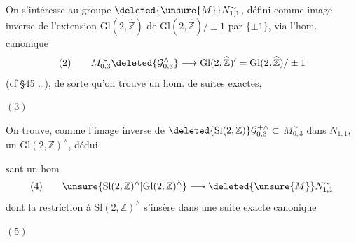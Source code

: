 On s'intéresse au groupe $\deleted{\unsure{M}}N_{1,1}^{\sim}$, défini  comme image inverse de l'extension $\mathrm{Gl}(2,\widehat{\mathbb Z})$ de $\mathrm{Gl}(2,\widehat{\mathbb Z})/\pm1$ par $\{\pm1\}$, via l'hom. canonique
\[
(2)\qquad
M_{0,3}^{\sim}\deleted{\mathcal G_{0,3}^{\wedge}}
\longrightarrow\mathrm{Gl}(2,\widehat{\mathbb Z})'
=\mathrm{Gl}(2,\widehat{\mathbb Z})/\pm1
\]
(cf \S45 \ldots), de sorte qu'on trouve un hom. de suites exactes,


$(3)$

On trouve,   comme l'image inverse de $\deleted{\mathrm{Sl}(2,\mathbb Z)}\mathcal G_{0,3}^{+\wedge}\subset$  $M_{0,3}^{\sim}$ dans $N_{1,1}$, un $\mathrm{Gl}(2,\mathbb Z)^\wedge$, dédui-



sant un hom
\[
(4)\qquad
\unsure{\mathrm{Sl}(2,\mathbb Z)^\wedge|\mathrm{Gl}(2,\mathbb Z)^\wedge}
\longrightarrow\deleted{\unsure{M}}N_{1,1}^{\sim}
\]
dont la restriction à $\mathrm{Sl}(2,\mathbb Z)^\wedge$ s'insère  dans une suite exacte canonique

$(5)$

